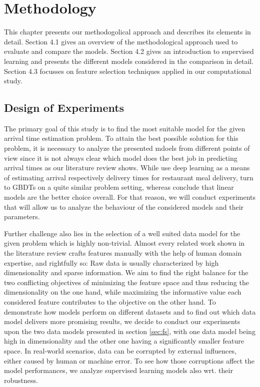 

\chapter{Methodology}
This chapter presents our methodogolical approach and describes its elements in detail. Section 4.1 gives an overview of the methodological approach used to evaluate and compare the models. 
Section 4.2 gives an introduction to supervised learning and presents the different models considered in the comparison in detail.
Section 4.3 focusses on feature selection techniques applied in our computational study.

\section{Design of Experiments}\label{sec:design}

The primary goal of this study is to find the most suitable model for the given arrival time estimation problem. 
To attain the best possible solution for this problem, it is necessary to analyze the presented mdoels from different points of view since it is not always clear which model does the best job in predicting arrival times as our literature review shows. 
While \cite{Zhu2020_OFCTE_DL} use deep learning as a means of estimating arrival respectively delivery times for restaurant meal delivery, \cite{Hildebrandt2020_EAT} turn to GBDTs on a quite similar problem setting, whereas \cite{Liu2018_LM_PLM} conclude that linear models are the better choice overall. 
For that reason, we will conduct experiments that will allow us to analyze the behaviour of the considered models and their parameters. 

Further challenge also lies in the selection of a well suited data model for the given problem which is highly non-trivial. 
Almost every related work shown in the literature review crafts features manually with the help of human domain expertise, and rightfully so: Raw data is usually characterized by high dimensionality and sparse information. We aim to find the right balance for the two conflicting objectives of minimizing the feature space and thus reducing the dimensionality on the one hand, while maximizing the informative value each considered feature contributes to the objective on the other hand. 
To demonstrate how models perform on different datasets and to find out which data model delivers more promising results, we decide to conduct our experiments upon the two data models presented in section \ref{sec:fs}, with one data model being high in dimensionality and the other one having a significantly smaller feature space.
In real-world scenarios, data can be corrupted by external influences, either caused by human or machine error. 
To see how those corruptions affect the model performances, we analyze supervised learning models also wrt. their robustness. 

